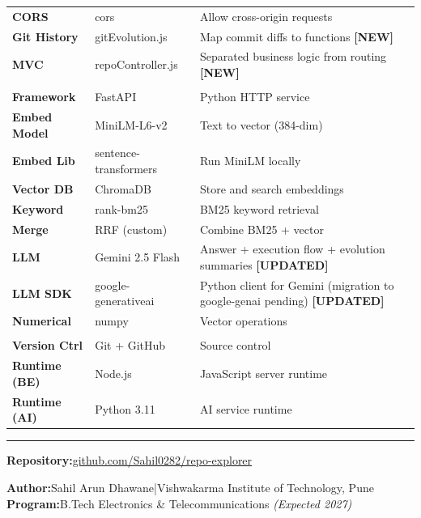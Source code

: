 \documentclass[a4paper,11pt]{article}
\begin{document}
\begin{center}
\begin{tabularx}{0.96\textwidth}{@{}>{\bfseries}lll@{}}
CORS         & cors               & Allow cross-origin requests \\
Git History  & gitEvolution.js    & Map commit diffs to functions \textbf{[NEW]} \\
MVC          & repoController.js  & Separated business logic from routing \textbf{[NEW]} \\
\midrule
\multicolumn{3}{@{}l}{\textit{\small\color{accentblue} Python AI Service}} \\[2pt]
Framework    & FastAPI                & Python HTTP service \\
Embed Model  & MiniLM-L6-v2          & Text to vector (384-dim) \\
Embed Lib    & sentence-transformers  & Run MiniLM locally \\
Vector DB    & ChromaDB              & Store and search embeddings \\
Keyword      & rank-bm25             & BM25 keyword retrieval \\
Merge        & RRF (custom)          & Combine BM25 + vector \\
LLM          & Gemini 2.5 Flash      & Answer + execution flow + evolution summaries \textbf{[UPDATED]} \\
LLM SDK      & google-generativeai   & Python client for Gemini (migration to google-genai pending) \textbf{[UPDATED]} \\
Numerical    & numpy                 & Vector operations \\
\midrule
\multicolumn{3}{@{}l}{\textit{\small\color{accentblue} Infrastructure}} \\[2pt]
Version Ctrl & Git + GitHub & Source control \\
Runtime (BE) & Node.js      & JavaScript server runtime \\
Runtime (AI) & Python 3.11  & AI service runtime \\
\bottomrule
\end{tabularx}
\end{center}

\vspace{1.2cm}

\begin{center}
\textcolor{medgray}{\rule{0.5\linewidth}{0.4pt}}
\end{center}

\vspace{0.4cm}

\noindent\textbf{Repository:}\quad\href{https://github.com/Sahil0282/repo-explorer}{github.com/Sahil0282/repo-explorer}

\vspace{0.4cm}

\noindent\textbf{Author:}\quad Sahil Arun Dhawane\quad|\quad Vishwakarma Institute of Technology, Pune\\[0.2cm]
\noindent\textbf{Program:}\quad B.Tech Electronics \& Telecommunications \textit{(Expected 2027)}
\end{document}
